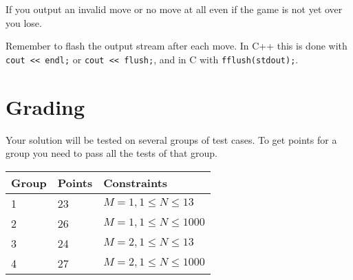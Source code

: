 If you output an invalid move or no move at all even if the game is not yet over you lose.

Remember to flash the output stream after each move.
In C++ this is done with \texttt{cout << endl;} or \texttt{cout << flush;}, and in C with \texttt{fflush(stdout);}.

\section*{Grading}
Your solution will be tested on several groups of test cases. To get points for a group you need to pass all the tests of that group.

\noindent
\begin{tabular}{| l | l | l |}
	\hline
	Group & Points & Constraints\\ \hline
1     & 23         & $ M=1, 1 \le N \le 13 $ \\ \hline
2     & 26         & $ M=1, 1 \le N \le 1000 $ \\ \hline
3     & 24         & $ M=2, 1 \le N \le 13 $ \\ \hline
4     & 27         & $ M=2, 1 \le N \le 1000 $ \\ \hline
\end{tabular}

